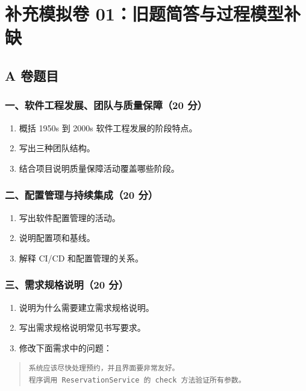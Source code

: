 \documentclass[UTF8,zihao=-4]{ctexart}
\begin{document}
\section{补充模拟卷 01：旧题简答与过程模型补缺}


\subsection{A 卷题目}


\subsubsection*{一、软件工程发展、团队与质量保障（20 分）}


\begin{enumerate}
\item 概括 1950s 到 2000s 软件工程发展的阶段特点。
\item 写出三种团队结构。
\item 结合项目说明质量保障活动覆盖哪些阶段。
\end{enumerate}


\subsubsection*{二、配置管理与持续集成（20 分）}


\begin{enumerate}
\item 写出软件配置管理的活动。
\item 说明配置项和基线。
\item 解释 CI/CD 和配置管理的关系。
\end{enumerate}


\subsubsection*{三、需求规格说明（20 分）}


\begin{enumerate}
\item 说明为什么需要建立需求规格说明。
\item 写出需求规格说明常见书写要求。
\item 修改下面需求中的问题：
\end{enumerate}


\begin{quote}
\footnotesize
\begin{verbatim}
系统应该尽快处理预约，并且界面要非常友好。
程序调用 ReservationService 的 check 方法验证所有参数。
\end{verbatim}
\end{quote}
\end{document}

